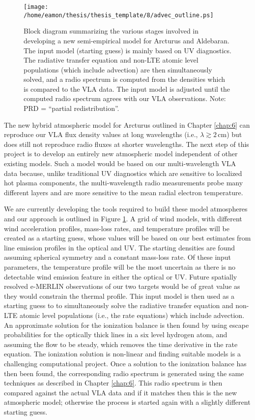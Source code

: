 \begin{figure}[!]
\centering 
        \texttt{[image: /home/eamon/thesis/thesis\_template/8/advec\_outline.ps]}
\caption[Block diagram for a new semi-empirical model]{Block diagram summarizing the various stages involved in developing a new semi-empirical model for Arcturus and Aldebaran. The input model (starting guess) is mainly based on UV diagnostics. The radiative transfer equation and non-LTE atomic level populations (which include advection) are then simultaneously solved, and a radio spectrum is computed from the densities which is compared to the VLA data. The input model is adjusted until the computed radio spectrum agrees with our VLA observations. Note: PRD =  ``partial redistribution''.} 
\label{fig:8.4}
\end{figure}

The new hybrid atmospheric model for Arcturus outlined in Chapter \ref{chap:6} can reproduce our VLA flux density values at long wavelengths (i.e., $\lambda \gtrsim 2\,$cm) but does still not reproduce radio fluxes at shorter wavelengths. The next step of this project is to develop an entirely new atmospheric model independent of other existing models. Such a model would be based on our multi-wavelength VLA data because, unlike traditional UV diagnostics which are sensitive to localized hot plasma components, the multi-wavelength radio measurements probe many different layers and are more sensitive to the mean radial electron temperature.

We are currently developing the tools required to build these model atmospheres and our approach is outlined in Figure \ref{fig:8.4}. A grid of wind models, with different wind acceleration profiles, mass-loss rates, and temperature profiles will be created as a starting guess, whose values will be based on our best estimates from line emission profiles in the optical and UV. The starting densities are found assuming spherical symmetry and a constant mass-loss rate. Of these input parameters, the temperature profile will be the most uncertain as there is no detectable wind emission feature in either the optical or UV. Future spatially resolved e-MERLIN observations of our two targets would be of great value as they would constrain the thermal profile. This input model is then used as a starting guess to to simultaneously solve the radiative transfer equation and non-LTE atomic level populations (i.e., the rate equations) which include advection. An approximate solution for the ionization balance is then found by using escape probabilities for the optically thick lines in a six level hydrogen atom, and assuming the flow to be steady, which removes the time derivative in the rate equation. The ionization solution is non-linear and finding suitable models is a challenging computational project. Once a solution to the ionization balance has then been found, the corresponding radio spectrum is generated using the same techniques as described in Chapter \ref{chap:6}. This radio spectrum is then compared against the actual VLA data and if it matches then this is the new atmospheric model; otherwise the process is started again with a slightly different starting guess.

